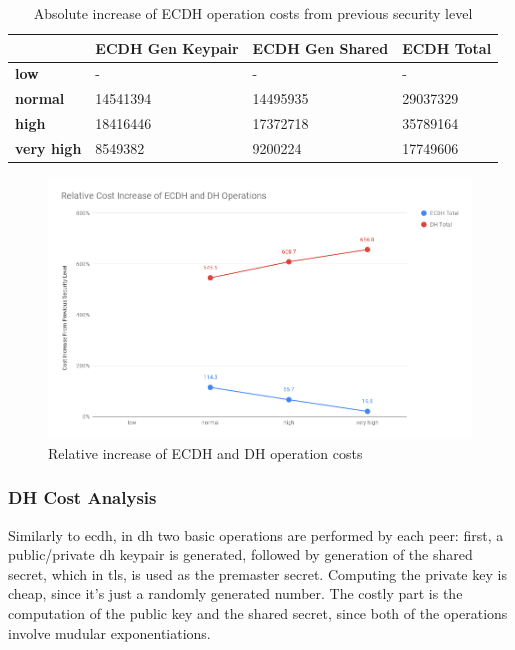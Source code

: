 \documentclass{llncs}
\begin{document}
\begin{table}[]
\begin{tabular}{|l|l|l|l|}
\hline
                   & \textbf{ECDH Gen Keypair} & \textbf{ECDH Gen Shared} & \textbf{ECDH Total} \\ \hline
\textbf{low}       & -                         & -                        & -                   \\ \hline
\textbf{normal}    & 14541394                  & 14495935                 & 29037329            \\ \hline
\textbf{high}      & 18416446                  & 17372718                 & 35789164            \\ \hline
\textbf{very high} & 8549382                   & 9200224                  & 17749606            \\ \hline
\end{tabular}
\centering \caption{\label{table:ecdh-absolute-cost-increase} Absolute increase of ECDH operation costs from previous security level}
\end{table}

  \begin{figure}
    \centering
    \includegraphics[width=1.0\textwidth]{img/ecdh_dh_relative_cost_increase.png}
    \centering \caption{\label{fig:ecdh-dh-relative-cost-increase} Relative increase of ECDH and DH operation costs}
  \end{figure}

\subsubsection{DH Cost Analysis}

Similarly to \gls{ecdh}, in \gls{dh} two basic operations are performed by each peer: first, a public/private \gls{dh} keypair is generated, followed
by generation of the shared secret, which in \gls{tls}, is used as the premaster secret. Computing the private key is cheap, since it's just a randomly 
generated number. The costly part is the computation of the public key and the shared secret, since both of the operations involve mudular exponentiations.
\end{document}
